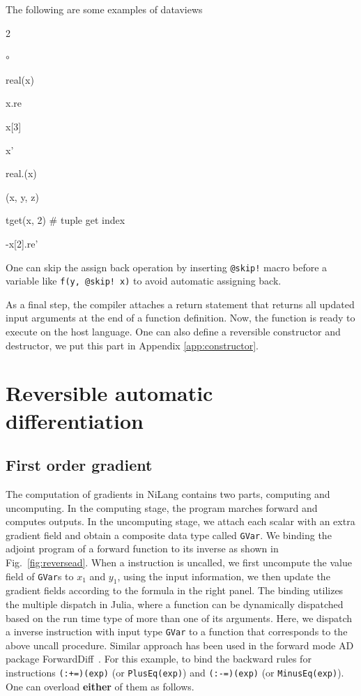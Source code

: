 \documentclass{article}
\newcommand{\<}{\langle}
\renewcommand{\>}{\rangle}
\newcommand{\Fig}[1]{Fig.~\ref{#1}}
\newcommand{\App}[1]{Appendix \ref{#1}}
\theoremstyle{definition}\newtheorem{definition}{\textit{Definition}}
\begin{document}
The following are some examples of dataviews\\
\begin{multicols}{2}
\begin{list}{$\circ$}{}
\item real(x)
\item x.re
\item x[3]
\item x'
\item real.(x)
\item (x, y, z)
\item tget(x, 2)  \# tuple get index
\item -x[2].re'
\end{list}
\end{multicols}

One can skip the assign back operation by inserting \texttt{@skip!} macro before a variable like \texttt{f(y, @skip! x)} to avoid automatic assigning back.

As a final step, the compiler attaches a return statement that returns all updated input arguments at the end of a function definition.
Now, the function is ready to execute on the host language.
One can also define a reversible constructor and destructor, we put this part in \App{app:constructor}.

\section{Reversible automatic differentiation}\label{sec:bp}

\subsection{First order gradient}\label{sec:jacobian}
The computation of gradients in NiLang contains two parts, computing and uncomputing. In the computing stage, the program marches forward and computes outputs.
In the uncomputing stage, we attach each scalar with an extra gradient field and obtain a composite data type called \texttt{GVar}. We binding the adjoint program of a forward function to its inverse as shown in \Fig{fig:reversead}.
When a instruction is uncalled, we first uncompute the value field of \texttt{GVar}s to $x_1$ and $y_1$, using the input information, we then update the gradient fields according to the formula in the right panel. The binding utilizes the multiple dispatch in Julia, where a function can be dynamically dispatched based on the run time type of more than one of its arguments. Here, we dispatch a inverse instruction with input type \texttt{GVar} to a function that corresponds to the above uncall procedure.
Similar approach has been used in the forward mode AD package ForwardDiff~\cite{Revels2016}.
For this example, to bind the backward rules for instructions \texttt{(:+=)(exp)} (or \texttt{PlusEq(exp)}) and \texttt{(:-=)(exp)} (or \texttt{MinusEq(exp)}). One can overload \textbf{either} of them as follows.
\end{document}
